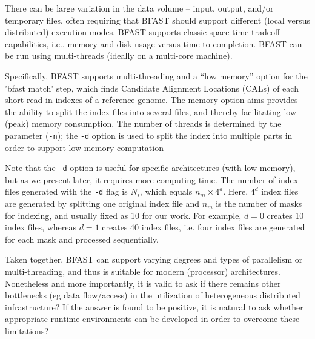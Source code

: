 \documentclass{cpeauth}
\begin{document}
 
There can be large variation in the data volume -- input, output,
and/or temporary files, often requiring that BFAST should support
different (local versus distributed) execution modes.  BFAST supports
classic space-time tradeoff capabilities, i.e., memory and disk usage
versus time-to-completion. BFAST can be run using multi-threads
(ideally on a multi-core machine).

Specifically, BFAST supports multi-threading and a ``low memory''
option for the 'bfast match' step, which finds Candidate Alignment
Locations (CALs) of each short read in indexes of a reference genome.
The memory option aims provides the ability to split the index files
into several files, and thereby facilitating low (peak) memory
consumption.  The number of threads is determined by the parameter
(\texttt{-n}); the \texttt{-d} option is used to split the index into
multiple parts in order to support low-memory computation


Note that the \texttt{-d} option is useful for specific architectures
(with low memory), but as we present later, it requires more computing
time.  The number of index files generated with the \texttt{-d} flag
is $N_i$, which equals $n_m \times 4^d$.  Here, $4^d$ index files are
generated by splitting one original index file and $n_m$ is the number
of masks for indexing, and usually fixed as 10 for our work.  For
example, $d=0$ creates 10 index files, whereas $d=1$ creates 40 index
files, i.e. four index files are generated for each mask and processed
sequentially.

Taken together, BFAST can support varying degrees and types of
parallelism or multi-threading, and thus is suitable for modern
(processor) architectures.  Nonetheless and more importantly, it is
valid to ask if there remains other bottlenecks (eg data flow/access)
in the utilization of heterogeneous distributed infrastructure?  If
the answer is found to be positive, it is natural to ask whether
appropriate runtime environments can be developed in order to overcome
these limitations?
\end{document}
